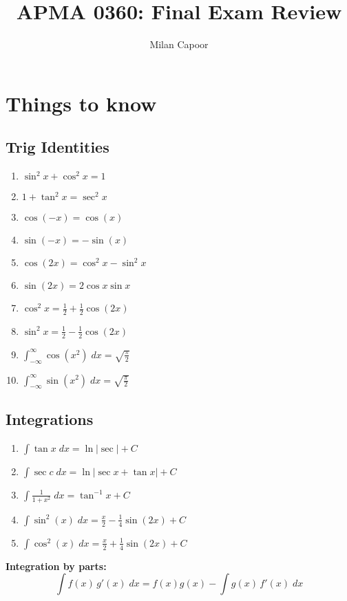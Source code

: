 \documentclass[10pt]{article}
\title{APMA 0360: Final Exam Review}
\author{Milan Capoor}
\date{}
\begin{document}
\maketitle
\tableofcontents

\section{Things to know}
\subsection{Trig Identities}
\begin{enumerate}
    \item $\sin^2 x + \cos^2 x=1$
    \item $1  +\tan^2 x = \sec^2 x$
    \item $\cos(-x) = \cos(x)$
    \item $\sin(-x) = -\sin(x)$
    \item $\cos(2x) = \cos^2 x - \sin^2 x$
    \item $\sin(2x) = 2\cos x \sin x$
    \item $\cos^2x = \frac{1}{2} + \frac{1}{2}\cos(2x)$
    \item $\sin^2 x = \frac{1}{2} - \frac{1}{2} \cos(2x)$
    \item $\int_{-\infty}^{\infty} \cos(x^2)\; dx = \sqrt{\frac{\pi}{2}}$
    \item $\int_{-\infty}^{\infty} \sin(x^2)\; dx = \sqrt{\frac{\pi}{2}}$
\end{enumerate}

\subsection{Integrations}
\begin{enumerate}
    \item $\int \tan x \; dx = \ln |\sec | + C$
    \item $\int \sec c\; dx = \ln | \sec x + \tan x| + C$
    \item $\int \frac{1}{1+x^2} \; dx = \tan^{-1}x + C$
    \item $\int \sin^2(x) \; dx = \frac{x}{2} - \frac{1}{4}\sin(2x) + C$
    \item $\int \cos^2(x) \; dx = \frac{x}{2} + \frac{1}{4}\sin(2x) + C$
\end{enumerate}

\textbf{Integration by parts:}
\[\int f(x)\, g'(x)\; dx = f(x)g(x) - \int g(x) \, f'(x)\; dx\]
\end{document}

